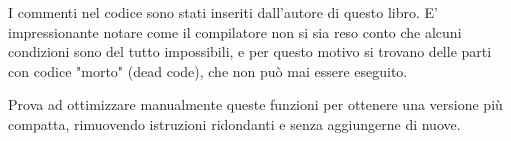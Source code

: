 




I commenti nel codice sono stati inseriti dall'autore di questo libro.
E' impressionante notare come il compilatore non si sia reso conto che alcuni condizioni sono del tutto impossibili, e per questo motivo
si trovano delle parti con codice "morto" (dead code), che non può mai essere eseguito.

\mysubparagraph{\Exercise}

Prova ad ottimizzare manualmente queste funzioni per ottenere una versione più compatta, rimuovendo istruzioni ridondanti e senza aggiungerne di nuove.

